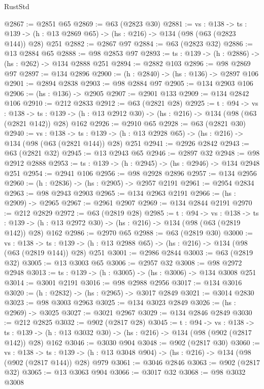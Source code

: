 \begin{lexlean}{RustStd}
\begin{coremodule}
@2867 := @2851 @65
@2869 := @63 (@2823 @30)
@2881 := {vs : @138} ->
  {ts : @139} -> (h : @13 @2869 @65) -> (hs : @216) -> @134 (@98 (@63 (@2823 @144)) @28) @251
@2882 := @2867 @97
@2884 := @63 (@2823 @32)
@2886 := @13 @2884 @65
@2888 := @98 @2853 @97
@2893 := {ts : @139} -> (h : @2886) -> (hs : @262) -> @134 @2888 @251
@2894 := @2882 @103
@2896 := @98 @2869 @97
@2897 := @134 @2896
@2900 := (h : @2840) -> (hs : @136) -> @2897 @106
@2901 := @2894 @2838
@2903 := @98 @2884 @97
@2905 := @134 @2903 @106
@2906 := (hs : @136) -> @2905
@2907 := @2901 @133
@2909 := @134 @2842 @106
@2910 := @212 @2833
@2912 := @63 (@2821 @28)
@2925 := {t : @94} ->
  {vs : @138} ->
  {ts : @139} -> (h : @13 @2912 @30) -> (hs : @216) -> @134 (@98 (@63 (@2821 @142)) @28) @162
@2926 := @2910 @65
@2928 := @63 (@2821 @30)
@2940 := {vs : @138} ->
  {ts : @139} -> (h : @13 @2928 @65) -> (hs : @216) -> @134 (@98 (@63 (@2821 @144)) @28) @251
@2941 := @2926 @2842
@2943 := @63 (@2821 @32)
@2945 := @13 @2943 @65
@2946 := @2897 @32
@2948 := @98 @2912 @2888
@2953 := {ts : @139} -> (h : @2945) -> (hs : @2946) -> @134 @2948 @251
@2954 := @2941 @106
@2956 := @98 @2928 @2896
@2957 := @134 @2956
@2960 := (h : @2836) -> (hs : @2905) -> @2957 @2191
@2961 := @2954 @2834
@2963 := @98 @2943 @2903
@2965 := @134 @2963 @2191
@2966 := (hs : @2909) -> @2965
@2967 := @2961 @2907
@2969 := @134 @2844 @2191
@2970 := @212 @2829
@2972 := @63 (@2819 @28)
@2985 := {t : @94} ->
  {vs : @138} ->
  {ts : @139} -> (h : @13 @2972 @30) -> (hs : @216) -> @134 (@98 (@63 (@2819 @142)) @28) @162
@2986 := @2970 @65
@2988 := @63 (@2819 @30)
@3000 := {vs : @138} ->
  {ts : @139} -> (h : @13 @2988 @65) -> (hs : @216) -> @134 (@98 (@63 (@2819 @144)) @28) @251
@3001 := @2986 @2844
@3003 := @63 (@2819 @32)
@3005 := @13 @3003 @65
@3006 := @2957 @32
@3008 := @98 @2972 @2948
@3013 := {ts : @139} -> (h : @3005) -> (hs : @3006) -> @134 @3008 @251
@3014 := @3001 @2191
@3016 := @98 @2988 @2956
@3017 := @134 @3016
@3020 := (h : @2832) -> (hs : @2965) -> @3017 @2849
@3021 := @3014 @2830
@3023 := @98 @3003 @2963
@3025 := @134 @3023 @2849
@3026 := (hs : @2969) -> @3025
@3027 := @3021 @2967
@3029 := @134 @2846 @2849
@3030 := @212 @2825
@3032 := @902 (@2817 @28)
@3045 := {t : @94} ->
  {vs : @138} ->
  {ts : @139} -> (h : @13 @3032 @30) -> (hs : @216) -> @134 (@98 (@902 (@2817 @142)) @28) @162
@3046 := @3030 @904
@3048 := @902 (@2817 @30)
@3060 := {vs : @138} ->
  {ts : @139} -> (h : @13 @3048 @904) -> (hs : @216) -> @134 (@98 (@902 (@2817 @144)) @28) @979
@3061 := @3046 @2846
@3063 := @902 (@2817 @32)
@3065 := @13 @3063 @904
@3066 := @3017 @32
@3068 := @98 @3032 @3008

\end{coremodule}
\end{lexlean}
